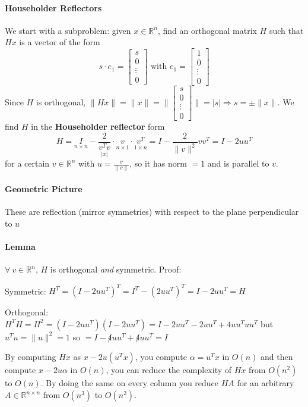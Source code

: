 \documentclass[10pt]{report}
\begin{document}
\paragraph{Householder Reflectors} We start with a subproblem: given $x\in \mathbb{R}^n$, find an orthogonal matrix $H$ such that $Hx$ is a vector of the form $$s\cdot e_1 = \left[\begin{array}{c}
s\\0\\\vdots\\0
\end{array}\right]\text{ with }e_1 = \left[\begin{array}{c}
1\\0\\\vdots\\0
\end{array}\right]$$
Since $H$ is orthogonal, $\|Hx\| = \|x\| = \|\left[\begin{array}{c}
s\\0\\\vdots\\0
\end{array}\right]\| = |s| \Rightarrow s = \pm\|x\|$. We find $H$ in the \textbf{Householder reflector} form $$H = \underset{n\times n}{I} - \underset{|x|}{\frac{2}{v^Tv}}\cdot\underset{n\times 1}{v}\cdot\underset{1\times n}{v^T}= I - \frac{2}{\|v\|^2}vv^T = I - 2uu^T$$ for a certain $v\in \mathbb{R}^n$ with $u = \frac{v}{\|v\|}$, so it has norm $=1$ and is parallel to $v$.
\paragraph{Geometric Picture} These are reflection (mirror symmetries) with respect to the plane perpendicular to $u$
\paragraph{Lemma}$\forall\:v\in \mathbb{R}^n$, $H$ is orthogonal \textit{and} symmetric. Proof:
\begin{list}{}{}
	\item Symmetric: $H^T = (I-2uu^T)^T = I^T - (2uu^T)^T = I - 2uu^T = H$
	\item Orthogonal: $H^TH = H^2 = (I-2uu^T)(I-2uu^T) = I - 2uu^T - 2uu^T + 4uu^Tuu^T$ but $u^Tu = \|u\|^2 = 1$ so $= I - \not 4uu^T + \not 4uu^T = I$
\end{list}
By computing $Hx$ as $x - 2u(u^T x)$, you compute $\alpha = u^Tx$ in $O(n)$ and then compute $x-2u\alpha$ in $O(n)$, you can reduce the complexity of $Hx$ from $O(n^2)$ to $O(n)$. By doing the same on every column you reduce $HA$ for an arbitrary $A\in \mathbb{R}^{n\times n}$ from $O(n^3)$ to $O(n^2)$.
\end{document}
